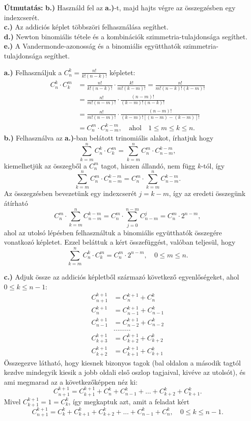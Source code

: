 \begin{solution}
\textbf{Útmutatás:} \textbf{b.)} Használd fel az \textbf{a.)}-t, majd
hajts végre az összegzésben egy indexcserét.\\
 \textbf{c.)} Az addiciós képlet többszöri felhasználása segíthet.\\
 \textbf{d.)} Newton binomiális tétele és a kombinációk szimmetria-tulajdonsága
segíthet.\\
 \textbf{e.)} A Vandermonde-azonosság és a binomiális együtthatók
szimmetria-tulajdonsága segíthet.

\vspace{0.3cm}
 \textbf{a.)} Felhasználjuk a $C_{n}^{k}=\frac{n!}{k!(n-k)!}$ képletet:
\begin{align*}
C_{n}^{k}\cdot C_{k}^{m} & =\frac{n!}{k!(n-k)!}\cdot\frac{k!}{m!(k-m)!}=\frac{n!}{m!(n-k)!(k-m)!}\\
 & =\frac{n!}{m!(n-m)!}\cdot\frac{(n-m)!}{(k-m)!(n-k)!}\\
 & =\frac{n!}{m!(n-m)!}\cdot\frac{(n-m)!}{(k-m)![(n-m)-(k-m)]!}\\
 & =C_{n}^{m}\cdot C_{n-m}^{k-m},\quad\text{ahol}\quad1\leq m\leq k\leq n.
\end{align*}
\textbf{b.)} Felhasználva az \textbf{a.)}-ban belátott trinomiális
alakot, írhatjuk hogy 
\[
{\displaystyle \sum_{k=m}^{n}C_{n}^{k}\cdot C_{k}^{m}={\displaystyle \sum_{k=m}^{n}C_{n}^{m}\cdot C_{n-m}^{k-m},}}
\]
kiemelhetjük az összegből a $C_{n}^{m}$ tagot, hiszen állandó, nem
függ $k$-tól, így 
\[
{\displaystyle \sum_{k=m}^{n}C_{n}^{m}\cdot C_{n-m}^{k-m}={\displaystyle C_{n}^{m}\cdot\sum_{k=m}^{n}C_{n-m}^{k-m}.}}
\]
Az összegzésben bevezetünk egy indexcserét $j=k-m$, így az eredeti
összegünk átírható 
\[
{\displaystyle C_{n}^{m}\cdot\sum_{k=m}^{n}C_{n-m}^{k-m}={\displaystyle C_{n}^{m}\cdot\sum_{j=0}^{n-m}C_{n-m}^{j}=C_{n}^{m}\cdot2^{n-m},}}
\]
ahol az utolsó lépésben felhasználtuk a binomiális együtthatók összegére
vonatkozó képletet. Ezzel beláttuk a kért összefüggést, valóban teljesül,
hogy 
\[
{\displaystyle \sum_{k=m}^{n}C_{n}^{k}\cdot C_{k}^{m}=C_{n}^{m}\cdot2^{n-m},\quad0\leq m\leq n.}
\]

\textbf{c.)} Adjuk össze az addiciós képletből származó következő
egyenlőségeket, ahol $0\leq k\leq n-1$: 
\begin{align*}
C_{n+1}^{k+1} & =C_{n}^{k+1}+C_{n}^{k}\\
C_{n}^{k+1} & =C_{n-1}^{k+1}+C_{n-1}^{k}\\
C_{n-1}^{k+1} & =C_{n-2}^{k+1}+C_{n-2}^{k}\\
 & \ldots\ldots\ldots\\
C_{k+3}^{k+1} & =C_{k+2}^{k+1}+C_{k+2}^{k}\\
C_{k+2}^{k+1} & =C_{k+1}^{k+1}+C_{k+1}^{k}
\end{align*}
Összegezve látható, hogy kiesnek bizonyos tagok (bal oldalon a második
tagtól kezdve mindegyik kiesik a jobb oldali első oszlop tagjaival,
kivéve az utolsót), és ami megmarad az a következőképpen néz ki: 
\[
C_{n+1}^{k+1}=C_{k+1}^{k+1}+C_{n}^{k}+C_{n-1}^{k}+\ldots+C_{k+2}^{k}+C_{k+1}^{k}.
\]
Mivel $C_{k+1}^{k+1}=1=C_{k}^{k}$, így megkaptuk azt, amit a feladat
kért 
\[
C_{n+1}^{k+1}=C_{k}^{k}+C_{k+1}^{k}+C_{k+2}^{k}+\ldots+C_{n-1}^{k}+C_{n}^{k},\quad0\leq k\leq n-1.
\]


\end{solution}
